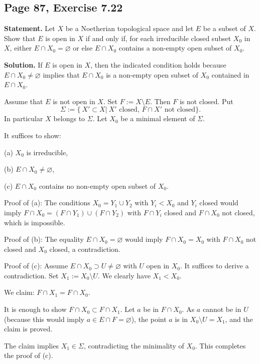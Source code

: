 \documentclass[parskip=half,fontsize=12pt]{scrartcl}%
\begin{document}
\subsection{Page 87, Exercise 7.22}%

\textbf{Statement.} Let $X$ be a Noetherian topological space and let $E$ be a subset of $X$. Show that $E$ is open in $X$ if and only if, for each irreducible closed subset $X_0$ in $X$, either $E\cap X_0=\varnothing$ or else $E\cap X_0$ contains a non-empty open subset of $X_0$.

\textbf{Solution.} If $E$ is open in $X$, then the indicated condition holds because $E\cap X_0\ne\varnothing$ implies that $E\cap X_0$ is a non-empty open subset of $X_0$ contained in $E\cap X_0$. %

Assume that $E$ is not open in $X$. Set $F:=X\setminus E$. Then $F$ is not closed. Put 
$$
\Sigma:=\{\ X'\subset X|\ X'\text{ closed, }F\cap X'\text{ not closed}\}.
$$ 
In particular $X$ belongs to $\Sigma$. Let $X_0$ be a minimal element of $\Sigma$.

It suffices to show:

\qquad(a) $X_0$ is irreducible,

\qquad(b) $E\cap X_0\ne\varnothing$,

\qquad(c) $E\cap X_0$ contains no non-empty open subset of $X_0$.

Proof of (a): %
The conditions $X_0=Y_1\cup Y_2$ with $Y_i<X_0$ and $Y_i$ closed would imply $F\cap X_0=(F\cap Y_1)\cup(F\cap Y_2)$ with $F\cap Y_i$ closed and $F\cap X_0$ not closed, which is impossible.

Proof of (b): The equality $E\cap X_0=\varnothing$ would imply $F\cap X_0=X_0$ with $F\cap X_0$ not closed and $X_0$ closed, a contradiction.

Proof of (c): Assume $E\cap X_0\supset U\ne\varnothing$ with $U$ open in $X_0$. It suffices to derive a contradiction. Set $X_1:=X_0\setminus U$. We clearly have $X_1<X_0$. 

We claim: $F\cap X_1=F\cap X_0$. 

It is enough to show $F\cap X_0\subset F\cap X_1$. Let $a$ be in $F\cap X_0$. As $a$ cannot be in $U$ (because this would imply $a\in E\cap F=\varnothing$), the point $a$ is in $X_0\setminus U=X_1$, and the claim is proved.

The claim implies $X_1\in\Sigma$, contradicting the minimality of $X_0$. This completes the proof of (c).
\end{document}
